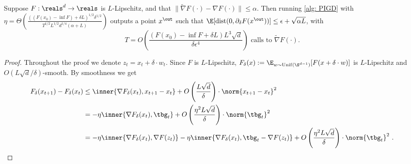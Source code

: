 \begin{theorem}\label{thm:practical_Lipschitz-min-with-inexact-grad-oracle}
Suppose $F:\reals^d\to\reals$ is $L$-Lipschitz, 
and that $\|\widetilde{\nabla} F(\cdot)-\nabla F(\cdot)\|\leq\alpha$. 
Then running \cref{alg: PIGD} with
$\eta=\Theta\left(\frac{{((F(x_0)-\inf F)+\delta L)^{1/2}\delta^{1/2}}}{{T^{1/2} L^{1/2}{d}^{1/4}(\alpha+L)}}\right)$
outputs a point $x^{\out}$ such that $\E[\mathrm{dist}(0,{\partial}_\delta F(x^{\out}))]\leq\epsilon+\sqrt{\alpha L}$, with \[T=O\left(\frac{(F(x_0)-\inf F+\delta L) L^3 \sqrt{d}}{\delta\epsilon^4}\right) \text{ 
calls to } \widetilde{\nabla}F(\cdot).\] 

\end{theorem}

\begin{proof}

Throughout the proof we denote $z_t=x_{t}+\delta\cdot w_t$.
Since $F$ is $L$-Lipschitz, $F_\delta(x):=\E_{w\sim\mathrm{Unif}(\S^{d-1})}[F(x+\delta\cdot w)]$ is $L$-Lipschitz and $O(L\sqrt{d}/\delta)$-smooth. By smoothness we get
\begin{align*}
F_{\delta}(x_{t+1})-F_{\delta}(x_{t})
&\leq \inner{\nabla F_{\delta}(x_t),x_{t+1}-x_{t}}+O\left(\frac{L\sqrt{d}}{\delta}\right)\cdot\norm{x_{t+1}-x_{t}}^2
\\
&=-\eta\inner{\nabla F_{\delta}(x_t),\tbg_t}+O\left(\frac{\eta^2 L\sqrt{d}}{\delta}\right)\cdot\norm{\tbg_t}^2
\\
&=-\eta\inner{\nabla F_{\delta}(x_t),\nabla F(z_t)}-\eta\inner{\nabla F_{\delta}(x_t),\tbg_t-\nabla F(z_t)}+O\left(\frac{\eta^2 L\sqrt{d}}{\delta}\right)\cdot\norm{\tbg_t}^2~.
\end{align*}



\end{proof}

